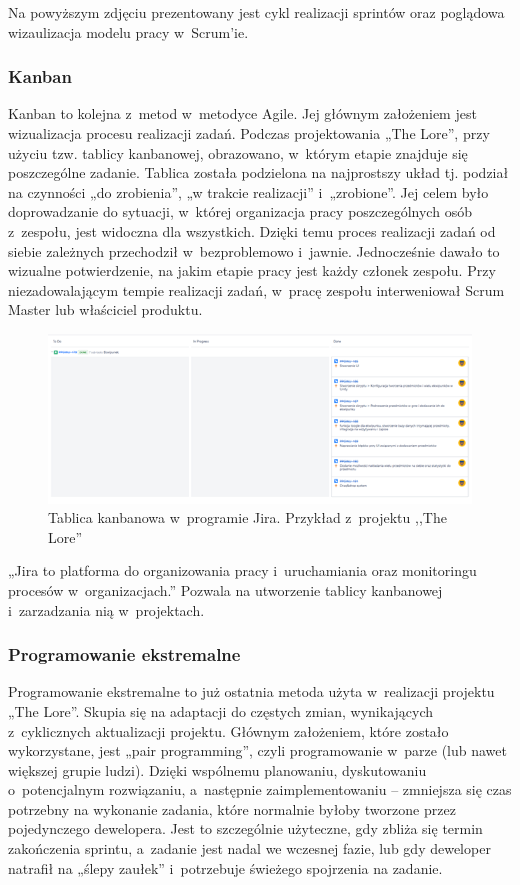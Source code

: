 \documentclass[oneside,polski,logo]{amuthesis}
\begin{document}
Na powyższym zdjęciu prezentowany jest cykl realizacji sprintów oraz poglądowa wizaulizacja modelu pracy w~Scrum'ie.

\subsubsection{Kanban}
Kanban to kolejna z~metod w~metodyce Agile. Jej głównym założeniem jest wizualizacja procesu realizacji zadań. Podczas projektowania „The Lore”, przy użyciu tzw. tablicy kanbanowej, obrazowano, w~którym etapie znajduje się poszczególne zadanie. Tablica została podzielona na najprostszy układ tj. podział na czynności „do zrobienia”, „w trakcie realizacji” i~„zrobione”. Jej celem było doprowadzanie do sytuacji, w~której organizacja pracy poszczególnych osób z~zespołu, jest widoczna dla wszystkich. Dzięki temu proces realizacji zadań od siebie zależnych przechodził w~bezproblemowo i~jawnie. Jednocześnie dawało to wizualne potwierdzenie, na jakim etapie pracy jest każdy członek zespołu. Przy niezadowalającym tempie realizacji zadań, w~pracę zespołu interweniował Scrum Master lub właściciel produktu. \cite{kanban}

\begin{figure}[h]
	\centering
	\includegraphics[width=15cm]{images/hyps/jira.png}
	\caption{Tablica kanbanowa w~programie Jira. Przykład z~projektu ,,The Lore''}
\end{figure}

„Jira to platforma do organizowania pracy i~uruchamiania oraz monitoringu procesów w~organizacjach.”  \cite{jira} Pozwala na utworzenie tablicy kanbanowej i~zarzadzania nią w~projektach. 

\subsubsection{Programowanie ekstremalne}
Programowanie ekstremalne to już ostatnia metoda użyta w~realizacji projektu „The Lore”. Skupia się na adaptacji do częstych zmian, wynikających z~cyklicznych aktualizacji projektu. Głównym założeniem, które zostało wykorzystane, jest „pair programming”, czyli programowanie w~parze (lub nawet większej grupie ludzi). Dzięki wspólnemu planowaniu, dyskutowaniu o~potencjalnym rozwiązaniu, a~następnie zaimplementowaniu – zmniejsza się czas potrzebny na wykonanie zadania, które normalnie byłoby tworzone przez pojedynczego dewelopera. Jest to szczególnie użyteczne, gdy zbliża się termin zakończenia sprintu, a~zadanie jest nadal we wczesnej fazie, lub gdy deweloper natrafił na „ślepy zaułek” i~potrzebuje świeżego spojrzenia na zadanie.
\end{document}
